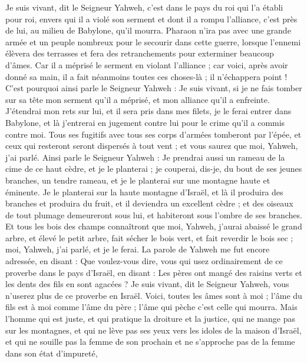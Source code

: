 \begin{multicols}{2}
Je suis vivant, dit le Seigneur Yahweh, c’est dans le pays du roi qui l'a établi pour roi, envers qui il a violé son serment et dont il a rompu l'alliance, c’est près de lui, au milieu de Babylone, qu’il mourra.
Pharaon n’ira pas avec une grande armée et un peuple nombreux pour le secourir dans cette guerre, lorsque l'ennemi élèvera des terrasses et fera des retranchements pour exterminer beaucoup d’âmes.
Car il a méprisé le serment en violant l'alliance ; car voici, après avoir donné sa main, il a fait néanmoins toutes ces choses-là ; il n'échappera point !
C'est pourquoi ainsi parle le Seigneur Yahweh : Je suis vivant, si je ne fais tomber sur sa tête mon serment qu'il a méprisé, et mon alliance qu'il a enfreinte.
J'étendrai mon rets sur lui, et il sera pris dans mes filets, je le ferai entrer dans Babylone, et là j'entrerai en jugement contre lui pour le crime qu'il a commis contre moi.
Tous ses fugitifs avec tous ses corps d’armées tomberont par l'épée, et ceux qui resteront seront dispersés à tout vent ; et vous saurez que moi, Yahweh, j'ai parlé.
Ainsi parle le Seigneur Yahweh : Je prendrai aussi un rameau de la cime de ce haut cèdre, et je le planterai ; je couperai, dis-je, du bout de ses jeunes branches, un tendre rameau, et je le planterai sur une montagne haute et éminente.
Je le planterai sur la haute montagne d'Israël, et là il produira des branches et produira du fruit, et il deviendra un excellent cèdre ; et des oiseaux de tout plumage demeureront sous lui, et habiteront sous l'ombre de ses branches.
Et tous les bois des champs connaîtront que moi, Yahweh, j'aurai abaissé le grand arbre, et élevé le petit arbre, fait sécher le bois vert, et fait reverdir le bois sec ; moi, Yahweh, j'ai parlé, et je le ferai.
\VerseOne{}La parole de Yahweh me fut encore adressée, en disant :
Que voulez-vous dire, vous qui usez ordinairement de ce proverbe dans le pays d'Israël, en disant : Les pères ont mangé des raisins verts et les dents des fils en sont agacées ?
Je suis vivant, dit le Seigneur Yahweh, vous n'userez plus de ce proverbe en Israël.
Voici, toutes les âmes sont à moi ; l'âme du fils est à moi comme l'âme du père ; l'âme qui pèche c’est celle qui mourra.
Mais l'homme qui est juste, et qui pratique la droiture et la justice,
qui ne mange pas sur les montagnes, et qui ne lève pas ses yeux vers les idoles de la maison d'Israël, et qui ne souille pas la femme de son prochain et ne s’approche pas de la femme dans son état d'impureté,

\end{multicols}
